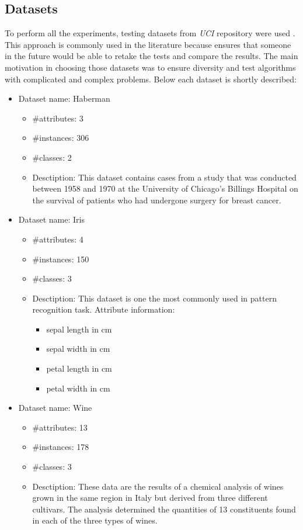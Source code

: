 \subsection{Datasets}
\label{cha:Datasets}
To perform all the experiments, testing datasets from \textit{UCI} repository were used \cite{bib47}.
This approach is commonly used in the literature because ensures that someone
in the future would be able to retake the tests and compare the results. 
The main motivation in choosing those datasets was to ensure diversity and test
algorithms with complicated and complex problems. Below each dataset is shortly
described:
\begin{itemize}
    \item Dataset name: Haberman
        \begin{itemize} 
            \item \#attributes: 3
            \item \#instances: 306
            \item \#classes: 2
            \item Desctiption:
                This dataset contains cases from a study that was conducted
                between 1958 and 1970 at the University of Chicago's Billings Hospital 
                on the survival of patients who had undergone surgery for breast cancer.
        \end{itemize}
    \item Dataset name: Iris
        \begin{itemize}
            \item \#attributes: 4
            \item \#instances: 150
            \item \#classes: 3
            \item Desctiption:
                This dataset is one the most commonly used in
                pattern recognition task. Attribute information:
                \begin{itemize}
                    \item sepal length in cm 
                    \item sepal width in cm 
                    \item petal length in cm 
                    \item petal width in cm 
                \end{itemize}
        \end{itemize} 
    \item Dataset name: Wine
        \begin{itemize}
            \item \#attributes: 13
            \item \#instances: 178
            \item \#classes: 3
            \item Desctiption:
                These data are the results of a chemical analysis of wines
                grown in the same region in Italy but derived from three 
                different cultivars. The analysis determined the quantities 
                of 13 constituents found in each of the three types of wines. 
        \end{itemize}


\end{itemize}
